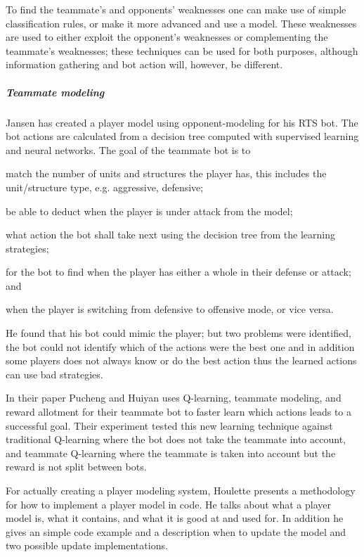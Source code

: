 To find the teammate’s and opponents’ weaknesses one can make use of simple classification rules, or make it more advanced and use a model. These weaknesses are used to either exploit the opponent's weaknesses or complementing the teammate's weaknesses; these techniques can be used for both purposes, although information gathering and bot action will, however, be different.

\subparagraph{Teammate modeling}
Jansen has created a player model using opponent-modeling for his RTS bot\cite{jansen07}. The bot actions are calculated from a  decision tree computed with supervised learning and neural networks. The goal of the teammate bot is to
\begin{inparaenum}[1\upshape)]
	\item match the number of units and structures the player has, this includes the unit/structure type, e.g. aggressive, defensive;
	\item be able to deduct when the player is under attack from the model;
	\item what action the bot shall take next using the decision tree from the learning strategies;
	\item for the bot to find when the player has either a whole in their defense or attack; and
	\item when the player is switching from defensive to offensive mode, or vice versa.
\end{inparaenum}
He found that his bot could mimic the player; but two problems were identified, the bot could not identify which of the actions were the best one and in addition some players does not always know or do the best action thus the learned actions can use bad strategies.

In their paper\cite{pucheng11} Pucheng and Huiyan uses Q-learning, teammate modeling, and reward allotment for their teammate bot to faster learn which actions leads to a successful goal. Their experiment tested this new learning technique against traditional Q-learning where the bot does not take the teammate into account, and teammate Q-learning where the teammate is taken into account but the reward is not split between bots.

For actually creating a player modeling system, Houlette presents a methodology for how to implement a player model in code\cite{houlette03}. He talks about what a player model is, what it contains, and what it is good at and used for. In addition he gives an simple code example and a description when to update the model and two possible update implementations.

